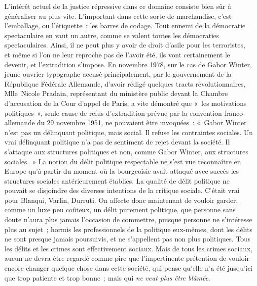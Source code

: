 \documentclass[french,twoside]{book} %
\def\mednobreak{\ifdim\lastskip<\medskipamount
  \removelastskip\nopagebreak\medskip\fi}
\newcommand{\labelblock}[1]{\medbreak{\noindent\color{rubric}\bfseries #1}\par\mednobreak}
\begin{document}
L’intérêt actuel de la justice répressive dans ce domaine consiste bien sûr à généraliser au plus vite. L’important dans cette sorte de marchandise, c’est l’emballage, ou l’étiquette : les barres de codage. Tout ennemi de la démocratie spectaculaire en vaut un autre, comme se valent toutes les démocraties spectaculaires. Ainsi, il ne peut plus y avoir de droit d’asile pour les terroristes, et même si l’on ne leur reproche pas de l’avoir été, ils vont certainement le devenir, et l’extradition s’impose. En novembre 1978, sur le cas de Gabor Winter, jeune ouvrier typographe accusé principalement, par le gouvernement de la République Fédérale Allemande, d’avoir rédigé quelques tracts révolutionnaires, Mlle Nicole Pradain, représentant du ministère public devant la Chambre d’accusation de la Cour d’appel de Paris, a vite démontré que « les motivations politiques », seule cause de refus d’extradition prévue par la convention franco-allemande du 29 novembre 1951, ne pouvaient être invoquées : « Gabor Winter n’est pas un délinquant politique, mais social. Il refuse les contraintes sociales. Un vrai délinquant politique n’a pas de sentiment de rejet devant la société. Il s’attaque aux structures politiques et non, comme Gabor Winter, aux structures sociales. » La notion du délit politique respectable ne s’est vue reconnaître en Europe qu’à partir du moment où la bourgeoisie avait attaqué avec succès les structures sociales antérieurement établies. La qualité de délit politique ne pouvait se disjoindre des diverses intentions de la critique sociale. C’était vrai pour Blanqui, Varlin, Durruti. On affecte donc maintenant de vouloir garder, comme un luxe peu coûteux, un délit purement politique, que personne sans doute n’aura plus jamais l’occasion de commettre, puisque personne ne s’intéresse plus au sujet ; hormis les professionnels de la politique eux-mêmes, dont les délits ne sont presque jamais poursuivis, et ne s’appellent pas non plus politiques. Tous les délits et les crimes sont effectivement sociaux. Mais de tous les crimes sociaux, aucun ne devra être regardé comme pire que l’impertinente prétention de vouloir encore changer quelque chose dans cette société, qui pense qu’elle n’a été jusqu’ici que trop patiente et trop bonne ; mais qui \emph{ne veut plus être blâmée}.\par

\labelblock{X}
\end{document}
